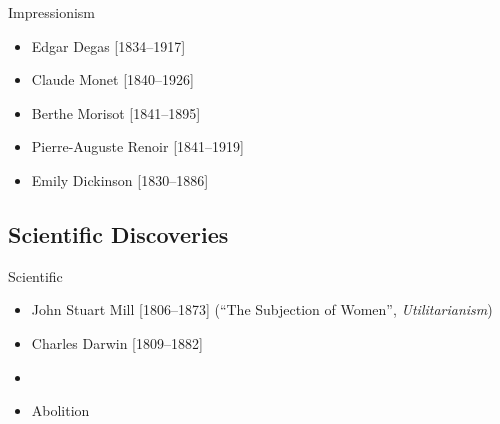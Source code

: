 \begin{frame}{Impressionism}
	\begin{itemize}
		\item<1->Edgar Degas [1834--1917]
		\item<1->Claude Monet [1840--1926]
		\item<1->Berthe Morisot [1841--1895]
		\item<1->Pierre-Auguste Renoir [1841--1919]
		\item<1->Emily Dickinson [1830--1886]
	\end{itemize}
\end{frame}

\subsection{Scientific Discoveries}
\begin{frame}{Scientific }
	\begin{itemize}
		\item<1->John Stuart Mill [1806--1873] (``The Subjection of Women'', \emph{Utilitarianism})
		\item<2->Charles Darwin [1809--1882]
		\item<3->
		\item<4->Abolition
	\end{itemize}
\end{frame}
